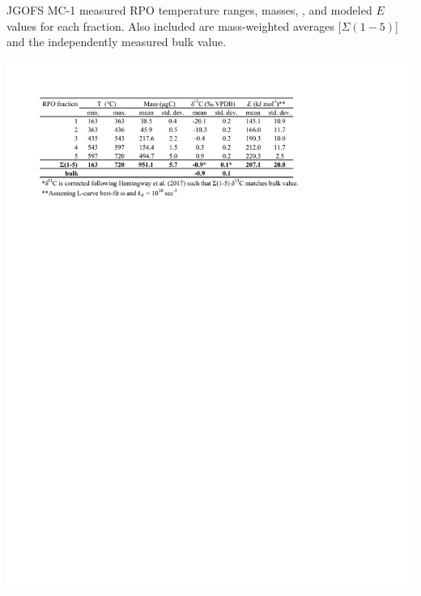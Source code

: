 \begin{table}
	\caption[JGOFS MC-1 RPO results]{JGOFS MC-1 measured RPO temperature ranges,  masses, , and modeled $E$ values for each fraction. Also included are mass-weighted averages [$\Sigma(1-5)$] and the independently measured bulk  value.}
	\centering
		\includegraphics{Thesis_Tables/Ch3Tab3}
	\label{Ch3Tab:3} 
\end{table}

